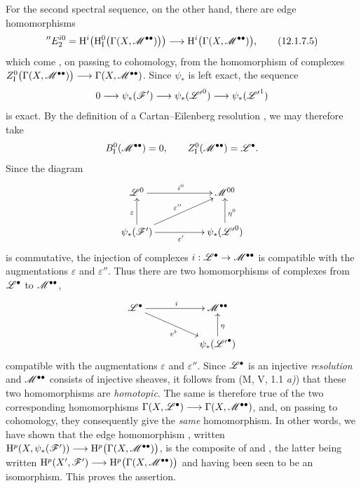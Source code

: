 \begin{env}[12.1.7]
For the second spectral sequence, on the other hand, there are edge
homomorphisms
\[
  {}''E_2^{i0}
  =\mathrm{H}^i\!\left(
      \mathrm{H}_\mathrm{I}^0
        \bigl(\Gamma(X,\mathscr{M}^{\bullet\bullet})\bigr)
    \right)
  \longrightarrow
  \mathrm{H}^i\bigl(\Gamma(X,\mathscr{M}^{\bullet\bullet})\bigr),
  \tag{12.1.7.5}
  \label{0.12.1.7.5}
\]
which come , on passing to cohomology, from the
homomorphism of complexes $Z_\mathrm{I}^0
\bigl(\Gamma(X,\mathscr{M}^{\bullet\bullet})\bigr)
\longrightarrow\Gamma(X,\mathscr{M}^{\bullet\bullet})$.
Since $\psi_*$ is left exact, the sequence
\[
  0\longrightarrow\psi_*(\mathscr{F}')
  \longrightarrow\psi_*({\mathscr{L}'}^0)
  \longrightarrow\psi_*({\mathscr{L}'}^1)
\]
is exact.
By the definition of a Cartan--Eilenberg resolution
, we may therefore take
\[
  B_\mathrm{I}^0(\mathscr{M}^{\bullet\bullet})=0,
  \qquad
  Z_\mathrm{I}^0(\mathscr{M}^{\bullet\bullet})=\mathscr{L}^\bullet.
\]
Since the diagram
\[
  \xymatrix@C=50pt@R=24pt{
    \sh{L}^0\ar[r]^{i^0}
      & \sh{M}^{00}\\
    \psi_*(\sh{F}')\ar[u]^\varepsilon
      \ar[r]_{\varepsilon'}\ar[ur]^{\varepsilon''}
      & \psi_*({\sh{L}'}^0)\ar[u]_{\eta^0}
  }
\]
is commutative, the injection of complexes
$i:\mathscr{L}^\bullet\to\mathscr{M}^{\bullet\bullet}$ is compatible with the
augmentations $\varepsilon$ and $\varepsilon''$.
Thus there are two homomorphisms of complexes from $\mathscr{L}^\bullet$
to $\mathscr{M}^{\bullet\bullet}$,
\[
  \xymatrix@C=52pt@R=22pt{
    \sh{L}^\bullet\ar[r]^i\ar[dr]_{v^\flat}
      & \sh{M}^{\bullet\bullet}\\
    & \psi_*({\sh{L}'}^\bullet)\ar[u]_\eta
  }
\]
compatible with the augmentations $\varepsilon$ and
$\varepsilon''$.
Since $\mathscr{L}^\bullet$ is an injective \emph{resolution} and
$\mathscr{M}^{\bullet\bullet}$ consists of injective sheaves, it follows
from (M, V, 1.1 \emph{a)}) that these two homomorphisms are \emph{homotopic}.
The same is therefore true of the two corresponding homomorphisms $\Gamma(X,\mathscr{L}^\bullet)
\longrightarrow\Gamma(X,\mathscr{M}^{\bullet\bullet})$,
and, on passing to cohomology, they consequently give the \emph{same}
homomorphism.
In other words, we have shown that the edge homomorphism
, written $\mathrm{H}^p(X,\psi_*(\mathscr{F}'))
\longrightarrow\mathrm{H}^p\bigl(\Gamma(X,\mathscr{M}^{\bullet\bullet})\bigr)$,
is the composite of  and
, the latter being written $\mathrm{H}^p(X',\mathscr{F}')
\longrightarrow\mathrm{H}^p\bigl(\Gamma(X,\mathscr{M}^{\bullet\bullet})\bigr)$
and having been seen to be an isomorphism.
This proves the assertion.
\end{env}

